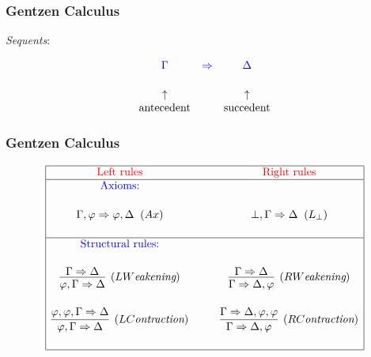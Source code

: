 \documentclass[10pt]{beamer}
\begin{document}
\begin{frame}
\frametitle{Gentzen Calculus}

\emph{Sequents}:

\[\begin{array}{ccc}
{\color{blue} \Gamma}&{\color{blue} \Rightarrow}&{\color{blue} \Delta}\\[5mm]
\uparrow && \uparrow\\
\mbox{antecedent}&&\mbox{succedent}\\
\end{array}\]
\end{frame}
\begin{frame}
\frametitle{Gentzen Calculus}

{\footnotesize
\begin{table}
\caption{\textsc{Rules of deduction \emph{\`a la} Gentzen for predicate logic}}
\label{rulesGentzenpredicatelogic}
\[\begin{array}{|c@{\hspace{1cm}}c|}
\hline
\mbox{{\color{red}Left rules}} & \mbox{{\color{red}Right rules}} \\
\hline 
\mbox{{\color{blue}Axioms:}}&\\[5mm]
\Gamma, \varphi \Rightarrow \varphi, \Delta\;\;(Ax)& 
\bot, \Gamma\Rightarrow\Delta\;\;(L_\bot)\\[5mm]
\hline
\mbox{{\color{blue}Structural rules:}}&\\[5mm]
\infer[(LW\mbox{\it eakening})]{\varphi,\Gamma\Rightarrow\Delta}{\Gamma\Rightarrow\Delta} & 
\infer[(RW\mbox{\it eakening})]{\Gamma\Rightarrow\Delta,\varphi}{\Gamma\Rightarrow\Delta}\\[5mm]
\infer[(LC\mbox{\it ontraction})]{\varphi,\Gamma\Rightarrow\Delta}{\varphi,\varphi,\Gamma\Rightarrow\Delta} & 
\infer[(RC\mbox{\it ontraction})]{\Gamma\Rightarrow\Delta,\varphi}{\Gamma\Rightarrow\Delta,\varphi,\varphi}\\[5mm]
\hline
\end{array}\]
\end{table}
}
\end{frame}
\end{document}
